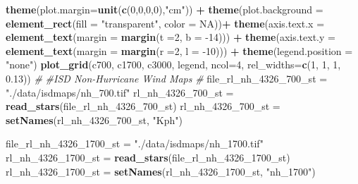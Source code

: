 \documentclass[12pt,twoside]{reedthesis}
\newenvironment{Shaded}{\begin{snugshade}}{\end{snugshade}}
\newcommand{\CommentTok}[1]{\textcolor[rgb]{0.56,0.35,0.01}{\textit{#1}}}
\newcommand{\DataTypeTok}[1]{\textcolor[rgb]{0.13,0.29,0.53}{#1}}
\newcommand{\DecValTok}[1]{\textcolor[rgb]{0.00,0.00,0.81}{#1}}
\newcommand{\FloatTok}[1]{\textcolor[rgb]{0.00,0.00,0.81}{#1}}
\newcommand{\KeywordTok}[1]{\textcolor[rgb]{0.13,0.29,0.53}{\textbf{#1}}}
\newcommand{\NormalTok}[1]{#1}
\newcommand{\OperatorTok}[1]{\textcolor[rgb]{0.81,0.36,0.00}{\textbf{#1}}}
\newcommand{\OtherTok}[1]{\textcolor[rgb]{0.56,0.35,0.01}{#1}}
\newcommand{\StringTok}[1]{\textcolor[rgb]{0.31,0.60,0.02}{#1}}
\begin{document}
\begin{Shaded}
\begin{Highlighting}[]
\StringTok{  }\KeywordTok{theme}\NormalTok{(}\DataTypeTok{plot.margin=}\KeywordTok{unit}\NormalTok{(}\KeywordTok{c}\NormalTok{(}\DecValTok{0}\NormalTok{,}\DecValTok{0}\NormalTok{,}\DecValTok{0}\NormalTok{,}\DecValTok{0}\NormalTok{),}\StringTok{"cm"}\NormalTok{)) }\OperatorTok{+}
\StringTok{  }\KeywordTok{theme}\NormalTok{(}\DataTypeTok{plot.background =} \KeywordTok{element_rect}\NormalTok{(}\DataTypeTok{fill =} \StringTok{"transparent"}\NormalTok{, }\DataTypeTok{color =} \OtherTok{NA}\NormalTok{))}\OperatorTok{+}
\StringTok{  }\KeywordTok{theme}\NormalTok{(}\DataTypeTok{axis.text.x =} \KeywordTok{element_text}\NormalTok{(}\DataTypeTok{margin =}  \KeywordTok{margin}\NormalTok{(}\DataTypeTok{t =}\DecValTok{2}\NormalTok{, }\DataTypeTok{b =} \DecValTok{-14}\NormalTok{))) }\OperatorTok{+}\StringTok{ }
\StringTok{  }\KeywordTok{theme}\NormalTok{(}\DataTypeTok{axis.text.y =} \KeywordTok{element_text}\NormalTok{(}\DataTypeTok{margin =}  \KeywordTok{margin}\NormalTok{(}\DataTypeTok{r =}\DecValTok{2}\NormalTok{, }\DataTypeTok{l =} \DecValTok{-10}\NormalTok{))) }\OperatorTok{+}
\StringTok{  }\KeywordTok{theme}\NormalTok{(}\DataTypeTok{legend.position =} \StringTok{"none"}\NormalTok{)}
\KeywordTok{plot_grid}\NormalTok{(c700, c1700, c3000, legend, }\DataTypeTok{ncol=}\DecValTok{4}\NormalTok{, }\DataTypeTok{rel_widths=}\KeywordTok{c}\NormalTok{(}\DecValTok{1}\NormalTok{, }\DecValTok{1}\NormalTok{, }\DecValTok{1}\NormalTok{, }\FloatTok{0.13}\NormalTok{))}
\CommentTok{#}
\CommentTok{#ISD Non-Hurricane Wind Maps}
\CommentTok{#}
\NormalTok{file_rl_nh_}\DecValTok{4326}\NormalTok{_}\DecValTok{700}\NormalTok{_st =}\StringTok{ "./data/isdmaps/nh_700.tif"}
\NormalTok{rl_nh_}\DecValTok{4326}\NormalTok{_}\DecValTok{700}\NormalTok{_st =}\StringTok{ }\KeywordTok{read_stars}\NormalTok{(file_rl_nh_}\DecValTok{4326}\NormalTok{_}\DecValTok{700}\NormalTok{_st)}
\NormalTok{rl_nh_}\DecValTok{4326}\NormalTok{_}\DecValTok{700}\NormalTok{_st =}\StringTok{ }\KeywordTok{setNames}\NormalTok{(rl_nh_}\DecValTok{4326}\NormalTok{_}\DecValTok{700}\NormalTok{_st, }\StringTok{"Kph"}\NormalTok{)}

\NormalTok{file_rl_nh_}\DecValTok{4326}\NormalTok{_}\DecValTok{1700}\NormalTok{_st =}\StringTok{ "./data/isdmaps/nh_1700.tif"}
\NormalTok{rl_nh_}\DecValTok{4326}\NormalTok{_}\DecValTok{1700}\NormalTok{_st =}\StringTok{ }\KeywordTok{read_stars}\NormalTok{(file_rl_nh_}\DecValTok{4326}\NormalTok{_}\DecValTok{1700}\NormalTok{_st)}
\NormalTok{rl_nh_}\DecValTok{4326}\NormalTok{_}\DecValTok{1700}\NormalTok{_st =}\StringTok{ }\KeywordTok{setNames}\NormalTok{(rl_nh_}\DecValTok{4326}\NormalTok{_}\DecValTok{1700}\NormalTok{_st, }\StringTok{"nh_1700"}\NormalTok{)}
 

\end{Highlighting}
\end{Shaded}
\end{document}
